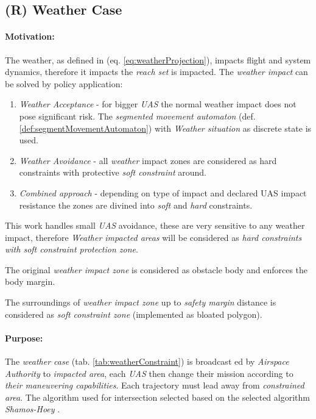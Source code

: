 \subsection{(R) Weather Case}\label{sec:weatherCase}
\paragraph{Motivation:}  The weather, as defined in (eq. \ref{eq:weatherProjection}), impacts flight and system dynamics, therefore it impacts the \emph{reach set} is impacted. The \emph{weather impact} can be solved by policy application:

\begin{enumerate}
    \item \emph{Weather Acceptance} - for bigger \emph{UAS} the normal weather impact does not pose significant risk.  The \emph{segmented movement automaton} (def. \ref{def:segmentMovementAutomaton}) with \emph{Weather situation} as discrete state is used.
    
    \item \emph{Weather Avoidance} - all \emph{weather} impact zones are considered as hard constraints with protective \emph{soft constraint} around.
    
    \item \emph{Combined approach} - depending on type of impact and declared UAS impact resistance the zones are divined into \emph{soft} and \emph{hard} constraints.
\end{enumerate}

\begin{note}
    This work handles small \emph{UAS} avoidance, these are very sensitive to any weather impact, therefore \emph{Weather impacted areas} will be considered as \emph{hard constraints with soft constraint protection zone}. 
    
    The original \emph{weather impact zone} is considered as obstacle body and enforces the body margin.
    
    The surroundings of \emph{weather impact zone} up to \emph{safety margin} distance is considered as \emph{soft constraint zone} (implemented as bloated polygon).
\end{note}

\paragraph{Purpose:} The \emph{weather case} (tab. \ref{tab:weatherConstraint}) is broadcast ed by \emph{Airspace Authority} to \emph{impacted area}, each \emph{UAS} then change their mission according to \emph{their maneuvering capabilities}.  Each trajectory must lead away from \emph{constrained area}. The algorithm used for intersection selected based on \citep{bentley1979algorithms} the selected algorithm  \emph{Shamos-Hoey} \cite{shamos1976geometric}.

